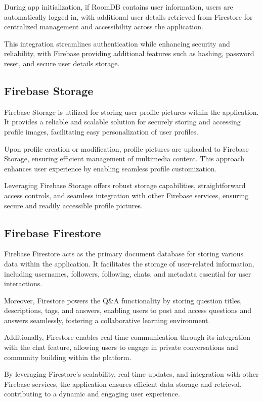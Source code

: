 During app initialization, if RoomDB contains user information, users are automatically logged in, with additional user details retrieved from Firestore for centralized management and accessibility across the application.

This integration streamlines authentication while enhancing security and reliability, with Firebase providing additional features such as hashing, password reset, and secure user details storage.

\subsection{Firebase Storage}

Firebase Storage is utilized for storing user profile pictures within the application. It provides a reliable and scalable solution for securely storing and accessing profile images, facilitating easy personalization of user profiles.

Upon profile creation or modification, profile pictures are uploaded to Firebase Storage, ensuring efficient management of multimedia content. This approach enhances user experience by enabling seamless profile customization.

Leveraging Firebase Storage offers robust storage capabilities, straightforward access controls, and seamless integration with other Firebase services, ensuring secure and readily accessible profile pictures.

\subsection{Firebase Firestore}

Firebase Firestore acts as the primary document database for storing various data within the application. It facilitates the storage of user-related information, including usernames, followers, following, chats, and metadata essential for user interactions.

Moreover, Firestore powers the Q\&A functionality by storing question titles, descriptions, tags, and answers, enabling users to post and access questions and answers seamlessly, fostering a collaborative learning environment.

Additionally, Firestore enables real-time communication through its integration with the chat feature, allowing users to engage in private conversations and community building within the platform.

By leveraging Firestore's scalability, real-time updates, and integration with other Firebase services, the application ensures efficient data storage and retrieval, contributing to a dynamic and engaging user experience.



